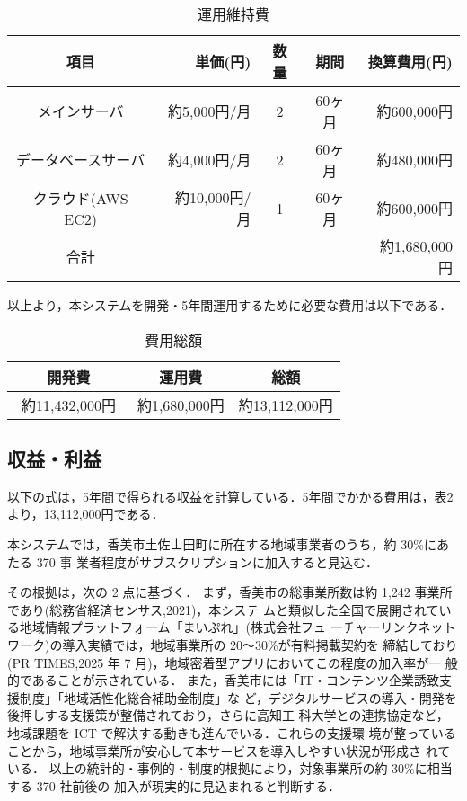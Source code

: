 \begin{table}[h]
  \centering
  \caption{運用維持費}
  \label{fig:Q11}
  \begin{tabular}{crccr}
  \hline
  項目  & 単価(円) & 数量  & 期間 & 換算費用(円) \\ \hline\hline
 
メインサーバ  & 約5,000円/月 & 2& 60ヶ月  & 約600,000円 \\ \hline

データベースサーバ & 約4,000円/月 &2& 60ヶ月 & 約480,000円 \\\hline

クラウド(AWS EC2)  &約10,000円/月&1 &60ヶ月 & 約600,000円 \\ \hline\hline

合計 &  & & & 約1,680,000円\\ \hline
\end{tabular}
\end{table}

以上より，本システムを開発・5年間運用するために必要な費用は以下である．
\begin{table}[h]
  \centering
  \caption{費用総額}
  \label{fig:Q12}
  \begin{tabular}{ccc}
  \hline
  開発費 & 運用費 & 総額  \\ \hline\hline
 約11,432,000円　& 約1,680,000円 & 約13,112,000円\\ \hline

\end{tabular}
\end{table}


\subsection{収益・利益}
以下の式は，5年間で得られる収益を計算している．5年間でかかる費用は，表\ref{fig:Q12}より，13,112,000円である．\par

本システムでは，香美市土佐山田町に所在する地域事業者のうち，約 30\%にあたる 370 事
業者程度がサブスクリプションに加入すると見込む．

その根拠は，次の 2 点に基づく．
まず，香美市の総事業所数は約 1,242 事業所であり(総務省経済センサス,2021)，本システ
ムと類似した全国で展開されている地域情報プラットフォーム「まいぷれ」(株式会社フュ
ーチャーリンクネットワーク)の導入実績では，地域事業所の 20〜30\%が有料掲載契約を
締結しており(PR TIMES,2025 年 7 月)，地域密着型アプリにおいてこの程度の加入率が一
般的であることが示されている．
また，香美市には「IT・コンテンツ企業誘致支援制度」「地域活性化総合補助金制度」な
ど，デジタルサービスの導入・開発を後押しする支援策が整備されており，さらに高知工
科大学との連携協定など，地域課題を ICT で解決する動きも進んでいる．これらの支援環
境が整っていることから，地域事業所が安心して本サービスを導入しやすい状況が形成さ
れている．
以上の統計的・事例的・制度的根拠により，対象事業所の約 30\%に相当する 370 社前後の
加入が現実的に見込まれると判断する．

